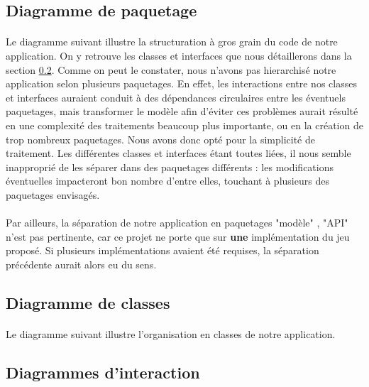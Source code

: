 \documentclass[a4paper]{article}
\begin{document}
\subsection{Diagramme de paquetage}
\paragraph{}
Le diagramme suivant illustre la structuration à gros grain du code de notre application. On y retrouve les classes et interfaces que nous détaillerons dans la section \ref{DDC}.
Comme on peut le constater, nous n'avons pas hierarchisé notre application selon plusieurs paquetages. En effet, les interactions entre nos classes et interfaces auraient conduit à des dépendances circulaires entre les éventuels paquetages, mais transformer le modèle afin d'éviter ces problèmes aurait résulté en une complexité des traitements beaucoup plus importante, ou en la création de trop nombreux paquetages. Nous avons donc opté pour la simplicité de traitement. Les différentes classes et interfaces étant toutes liées, il nous semble inapproprié de les séparer dans des paquetages différents : les modifications éventuelles impacteront bon nombre d'entre elles, touchant à plusieurs des paquetages envisagés.

\paragraph{}
Par ailleurs, la séparation de notre application en paquetages "modèle" , "API" n'est pas pertinente, car ce projet ne porte que sur \textbf{une} implémentation du jeu proposé. Si plusieurs implémentations avaient été requises, la séparation précédente aurait alors eu du sens.



\subsection{Diagramme de classes}
\label{DDC}
\paragraph{}
Le diagramme suivant illustre l'organisation en classes de notre application.



\subsection{Diagrammes d'interaction}
\end{document}
